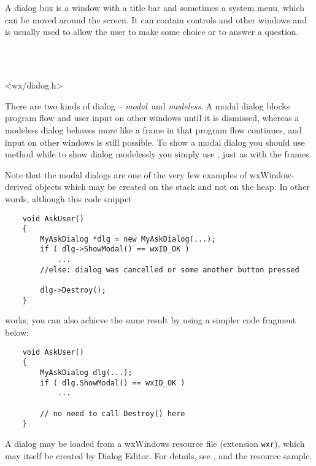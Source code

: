\section{}\label{wxdialog}

A dialog box is a window with a title bar and sometimes a system menu, which
can be moved around the screen. It can contain controls and other windows and
is usually used to allow the user to make some choice or to answer a question.


\\
\\


<wx/dialog.h>


There are two kinds of dialog -- {\it modal}\ and {\it modeless}. A modal dialog
blocks program flow and user input on other windows until it is dismissed,
whereas a modeless dialog behaves more like a frame in that program flow
continues, and input on other windows is still possible. To show a modal dialog
you should use  method while to show
dialog modelessly you simply use , just as with the
frames.

Note that the modal dialogs are one of the very few examples of
wxWindow-derived objects which may be created on the stack and not on the heap.
In other words, although this code snippet
\begin{verbatim}
    void AskUser()
    {
        MyAskDialog *dlg = new MyAskDialog(...);
        if ( dlg->ShowModal() == wxID_OK )
            ...
        //else: dialog was cancelled or some another button pressed

        dlg->Destroy();
    }
\end{verbatim}
works, you can also achieve the same result by using a simpler code fragment
below:
\begin{verbatim}
    void AskUser()
    {
        MyAskDialog dlg(...);
        if ( dlg.ShowModal() == wxID_OK )
            ...

        // no need to call Destroy() here
    }
\end{verbatim}

A dialog may be loaded from a wxWindows resource file (extension {\tt wxr}),
which may itself be created by Dialog Editor. For details, see 
, 
and the resource sample.

